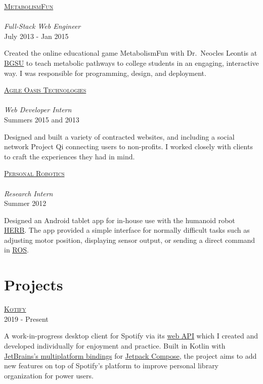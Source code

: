 \documentclass[letterpaper,10pt]{article}
\newcommand{\lb}{\vspace{4pt} \\}
\newenvironment{resumecols2}[2]
{
    \begin{minipage}[t]{.21\linewidth}
        \begin{flushright}
            \textsc{#1}
            \lb
            \small{#2}
        \end{flushright}
    \end{minipage}
    \hspace{.004\linewidth}
    \begin{minipage}[t]{.775\linewidth}
}
{
    \end{minipage}
}
\newenvironment{resumecols}[4]
{
    \begin{minipage}[t]{.21\linewidth}
        \begin{flushright}
            \href{#2}{\textsc{#1}} \\
            \lb
            \small{\textit{#3}} \\
            \small{#4}
        \end{flushright}
    \end{minipage}
    \hspace{.004\linewidth}
    \begin{minipage}[t]{.775\linewidth}
}
{
    \end{minipage}
}
\begin{document}
\vspace{6pt}

\begin{resumecols}{MetabolismFun }{https://github.com/dzirbel/metabolism-fun}{Full-Stack Web Engineer}{July 2013 - Jan 2015}
    Created the online educational game MetabolismFun with Dr.\ Neocles Leontis at \href{https://www.bgsu.edu/}{\underline{BGSU}} to teach metabolic pathways to college students in an engaging, interactive way. I was responsible for programming, design, and deployment.
\end{resumecols}

\vspace{6pt}

\begin{resumecols}{Agile Oasis Technologies}{http://agileoasis.com}{Web Developer Intern}{Summers 2015 and 2013}
    Designed and built a variety of contracted websites, and including a social network Project Qi connecting users to non-profits. I worked closely with clients to craft the experiences they had in mind.
\end{resumecols}

\vspace{6pt}

\begin{resumecols}{Personal Robotics}{https://personalrobotics.cs.washington.edu}{Research Intern}{Summer 2012}
    Designed an Android tablet app for in-house use with the humanoid robot \href{https://robotsguide.com/robots/herb}{\underline{HERB}}. The app provided a simple interface for normally difficult tasks such as adjusting motor position, displaying sensor output, or sending a direct command in \href{https://www.ros.org/}{\underline{ROS}}.
\end{resumecols}

\section{Projects}

\begin{resumecols2}{\href{https://github.com/dzirbel/kotify}{Kotify \faicon{github}}}{2019 - Present}
    A work-in-progress desktop client for Spotify via its \href{https://developer.spotify.com/documentation/web-api/}{web API} which I created and developed individually for enjoyment and practice. Built in Kotlin with \href{https://www.jetbrains.com/lp/compose-mpp/}{JetBrains's multiplatform bindings} for \href{https://developer.android.com/jetpack/compose}{Jetpack Compose}, the project aims to add new features on top of Spotify's platform to improve personal library organization for power users.
\end{resumecols2}
\end{document}
